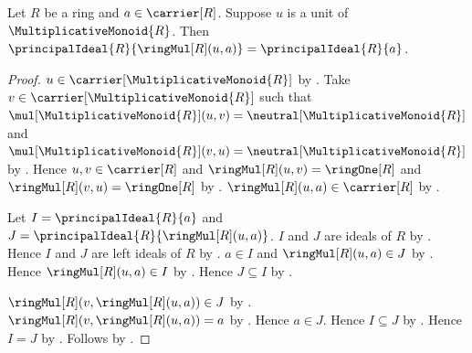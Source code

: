 \begin{theorem}\label{principal_ideal_mul_unit_left}
    Let $R$ be a ring and $a\in\carrier[R]$.
    Suppose $u$ is a unit of $\MultiplicativeMonoid{R}$.
    Then
        $\principalIdeal{R}{\ringMul[R](u,a)}
            =\principalIdeal{R}{a}$.
\end{theorem}
\begin{proof}
    $u\in\carrier[\MultiplicativeMonoid{R}]$ by
        .
    Take $v\in\carrier[\MultiplicativeMonoid{R}]$ such that
        $\mul[\MultiplicativeMonoid{R}](u,v)
            =\neutral[\MultiplicativeMonoid{R}]$ and
        $\mul[\MultiplicativeMonoid{R}](v,u)
            =\neutral[\MultiplicativeMonoid{R}]$ by
        .
    Hence $u,v\in\carrier[R]$ and
        $\ringMul[R](u,v)=\ringOne[R]$ and
        $\ringMul[R](v,u)=\ringOne[R]$ by
        .
    $\ringMul[R](u,a)\in\carrier[R]$ by .

    Let $I=\principalIdeal{R}{a}$ and
        $J=\principalIdeal{R}{\ringMul[R](u,a)}$.
    $I$ and $J$ are ideals of $R$ by
        .
    Hence $I$ and $J$ are left ideals of $R$ by
        .
    $a\in I$ and $\ringMul[R](u,a)\in J$ by
        .
    Hence $\ringMul[R](u,a)\in I$ by
        .
    Hence $J\subseteq I$ by
        .

    $\ringMul[R](v,\ringMul[R](u,a))\in J$ by
        .
    $\ringMul[R](v,\ringMul[R](u,a))=a$ by
        .
    Hence $a\in J$.
    Hence $I\subseteq J$ by
        .
    Hence $I=J$ by .
    Follows by \auto.
\end{proof}

